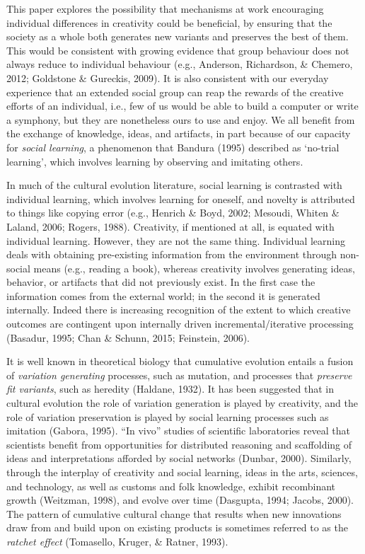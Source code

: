 \documentclass[a4paper,12pt,man,british]{apa6}
\begin{document}
This paper explores the possibility that mechanisms at work encouraging individual differences in creativity could be beneficial, by ensuring that the society as a whole both generates new variants and preserves the best of them.
This would be consistent with growing evidence that group behaviour does not always reduce to individual behaviour (e.g., Anderson, Richardson, \& Chemero, 2012; Goldstone \& Gureckis, 2009). It is also consistent with our everyday experience that an extended social group can reap the rewards of the creative efforts of an individual, i.e., few of us would be able to build a computer or write a symphony, but they are nonetheless ours to use and enjoy. We all benefit from the exchange of knowledge, ideas, and artifacts, in part because of our capacity for \emph{social learning}, a phenomenon that Bandura (1995) described as `no-trial learning', which involves learning by observing and imitating others.

In much of the cultural evolution literature, social learning is contrasted with individual learning, which involves learning for oneself, and novelty is attributed to things like copying error (e.g., Henrich \& Boyd, 2002; Mesoudi, Whiten \& Laland, 2006; Rogers, 1988). Creativity, if mentioned at all, is equated with individual learning. However, they are not the same thing. Individual learning deals with obtaining pre-existing information from the environment through non-social means (e.g., reading a book), whereas creativity involves generating ideas, behavior, or artifacts that did not previously exist. In the first case the information comes from the external world; in the second it is generated internally. Indeed there is increasing recognition of the extent to which creative outcomes are contingent upon internally driven incremental/iterative processing (Basadur, 1995; Chan \& Schunn, 2015; Feinstein, 2006). 

It is well known in theoretical biology that  cumulative evolution entails a fusion of \emph{variation generating} processes, such as mutation, and processes that \emph{preserve fit variants}, such as heredity (Haldane, 1932). It has been suggested that in cultural evolution the role of variation generation is played by creativity, and the role of variation preservation is played by social learning processes such as imitation (Gabora, 1995). 
``In vivo'' studies of scientific laboratories reveal that scientists benefit from opportunities for distributed reasoning and scaffolding of ideas and interpretations afforded by social networks (Dunbar, 2000). Similarly, through the interplay of creativity and social learning, ideas in the arts, sciences, and technology, as well as customs and folk knowledge, exhibit recombinant growth (Weitzman, 1998), and evolve over time (Dasgupta, 1994; Jacobs, 2000). The pattern of cumulative cultural change that results when new innovations draw from and build upon on existing products is sometimes referred to as the \emph{ratchet effect} (Tomasello, Kruger, \& Ratner, 1993). 
\end{document}
